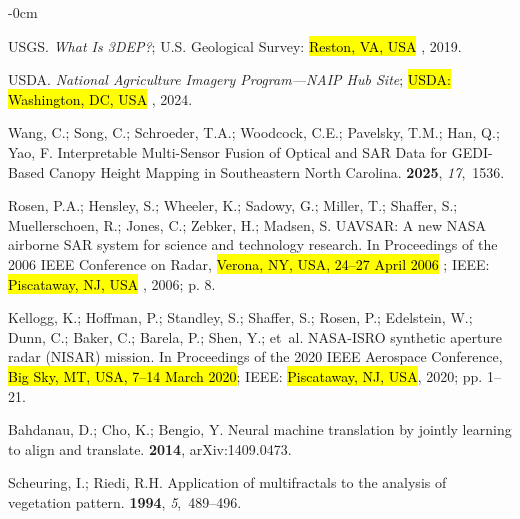 \documentclass[remotesensing,article,accept,pdftex,moreauthors]{Definitions/mdpi}
\begin{document}
\begin{adjustwidth}{-\extralength}{0cm}
\begin{thebibliography}{999}
USGS.
\newblock \emph{What Is {3DEP}?}; U.S. Geological Survey: \hl{Reston, VA, USA}%
, 2019.

USDA.
\newblock \emph{National Agriculture Imagery Program---NAIP Hub Site}; \hl{USDA: Washington, DC, USA}%
, 2024.

Wang, C.; Song, C.; Schroeder, T.A.; Woodcock, C.E.; Pavelsky, T.M.; Han, Q.;
  Yao, F.
\newblock Interpretable Multi-Sensor Fusion of Optical and SAR Data for
  GEDI-Based Canopy Height Mapping in Southeastern North Carolina.
 {\bf 2025}, {\em 17},~1536.

Rosen, P.A.; Hensley, S.; Wheeler, K.; Sadowy, G.; Miller, T.; Shaffer, S.;
  Muellerschoen, R.; Jones, C.; Zebker, H.; Madsen, S.
\newblock UAVSAR: A new NASA airborne SAR system for science and technology
  research.
\newblock In Proceedings of the 2006 IEEE Conference on Radar, \hl{Verona, NY, USA, 24--27 April 2006}%
; IEEE: \hl{Piscataway, NJ, USA}%
, 2006; p. 8.

Kellogg, K.; Hoffman, P.; Standley, S.; Shaffer, S.; Rosen, P.; Edelstein, W.;
  Dunn, C.; Baker, C.; Barela, P.; Shen, Y.;  et~al.
\newblock NASA-ISRO synthetic aperture radar (NISAR) mission.
\newblock In Proceedings of the 2020 IEEE Aerospace Conference, \hl{Big Sky, MT, USA, 7--14 March 2020}; IEEE: \hl{Piscataway, NJ, USA}, 2020;
  pp. 1--21.

Bahdanau, D.; Cho, K.; Bengio, Y.
\newblock Neural machine translation by jointly learning to align and
  translate.
 {\bf 2014}, arXiv:1409.0473.

Scheuring, I.; Riedi, R.H.
\newblock Application of multifractals to the analysis of vegetation pattern.
 {\bf 1994}, {\em 5},~489--496.


\end{thebibliography}
\end{adjustwidth}
\end{document}
